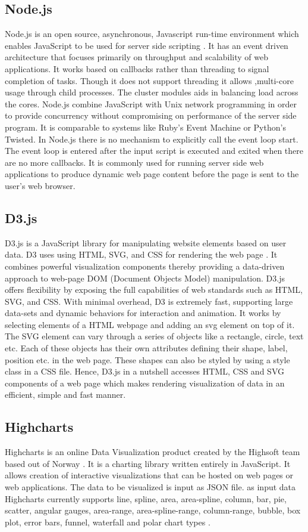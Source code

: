 \documentclass[9pt,twocolumn,twoside]{styles/osajnl}
\begin{document}
\subsection{Node.js}
Node.js is an open source, asynchronous, Javascript run-time environment which enables JavaScript to be used for server side scripting \cite{www-nodejs}. It has an event driven architecture that focuses primarily on throughput and scalability of web applications. It works based on callbacks rather than threading to signal completion of tasks. Though it does not support threading it allows ,multi-core  usage through child processes. The cluster modules aids in balancing load across the cores. Node.js combine JavaScript with Unix network programming in order to provide concurrency without compromising on performance of the server side program. It is comparable to systems like Ruby's Event Machine or Python's Twisted. In Node.js there is no mechanism to explicitly call the event loop start. The event loop is entered after the input script is executed and exited when there are no more callbacks. It is commonly used for running server side web applications to produce dynamic web page content before the page is sent to the user's web browser.
\subsection{D3.js}
D3.js is a JavaScript library for manipulating website elements based on user data. D3 uses using HTML, SVG, and CSS for rendering the web page \cite{www-d3-web}. It combines powerful visualization components thereby providing a data-driven approach to web-page DOM (Document Objects Model) manipulation. D3.js offers flexibility by exposing the full capabilities of web standards such as HTML, SVG, and CSS. With minimal overhead, D3 is extremely fast, supporting large data-sets and dynamic behaviors for interaction and animation. It works by selecting elements of a HTML webpage and adding an svg element on top of it. The SVG element can vary through a series of objects like a rectangle, circle, text etc. Each of these objects has their own attributes defining their shape, label, position etc. in the web page. These shapes can also be styled by using a style class in a CSS file. Hence, D3.js in a nutshell accesses HTML, CSS and SVG components of a web page which makes rendering visualization of data in an efficient, simple and fast manner.
\subsection{Highcharts}
Highcharts is an online Data Visualization product created by the Highsoft team based out of Norway \cite{www-highwiki}. It is a charting library written entirely in JavaScript. It allows creation of interactive visualizations that can be hosted on web pages or web applications. The data to be visualized is input as JSON file. as input data Highcharts currently supports line, spline, area, area-spline, column, bar, pie, scatter, angular gauges, area-range, area-spline-range, column-range, bubble, box plot, error bars, funnel, waterfall and polar chart types  \cite{www-Highcharts}.
\end{document}

